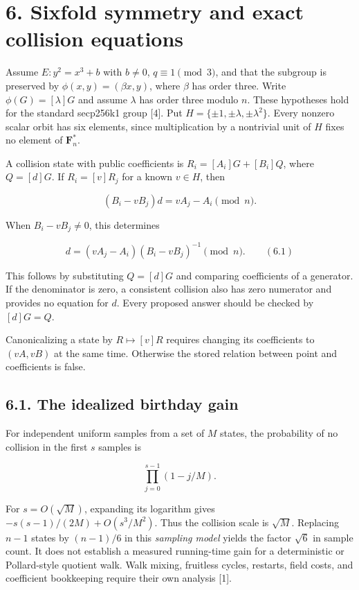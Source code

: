 \documentclass[
  11pt,
  a4paper,
]{article}
\begin{document}
\section{6. Sixfold symmetry and exact collision
equations}\label{sixfold-symmetry-and-exact-collision-equations}

Assume \(E:y^2=x^3+b\) with \(b\neq0\), \(q\equiv1\pmod3\), and that the
subgroup is preserved by \(\phi(x,y)=(\beta x,y)\), where \(\beta\) has
order three. Write \(\phi(G)=[\lambda]G\) and assume \(\lambda\) has
order three modulo \(n\). These hypotheses hold for the standard
secp256k1 group {[}4{]}. Put \(H=\{\pm1,\pm\lambda,\pm\lambda^2\}\).
Every nonzero scalar orbit has six elements, since multiplication by a
nontrivial unit of \(H\) fixes no element of \(\mathbf F_n^*\).

A collision state with public coefficients is \(R_i=[A_i]G+[B_i]Q\),
where \(Q=[d]G\). If \(R_i=[v]R_j\) for a known \(v\in H\), then

\[
(B_i-vB_j)d=vA_j-A_i\pmod n.
\]

When \(B_i-vB_j\neq0\), this determines

\[
d=(vA_j-A_i)(B_i-vB_j)^{-1}\pmod n. \qquad (6.1)
\]

This follows by substituting \(Q=[d]G\) and comparing coefficients of a
generator. If the denominator is zero, a consistent collision also has
zero numerator and provides no equation for \(d\). Every proposed answer
should be checked by \([d]G=Q\).

Canonicalizing a state by \(R\mapsto[v]R\) requires changing its
coefficients to \((vA,vB)\) at the same time. Otherwise the stored
relation between point and coefficients is false.

\subsection{6.1. The idealized birthday
gain}\label{the-idealized-birthday-gain}

For independent uniform samples from a set of \(M\) states, the
probability of no collision in the first \(s\) samples is

\[
\prod_{j=0}^{s-1}(1-j/M).
\]

For \(s=O(\sqrt M)\), expanding its logarithm gives
\(-s(s-1)/(2M)+O(s^3/M^2)\). Thus the collision scale is \(\sqrt M\).
Replacing \(n-1\) states by \((n-1)/6\) in this \emph{sampling model}
yields the factor \(\sqrt6\) in sample count. It does not establish a
measured running-time gain for a deterministic or Pollard-style quotient
walk. Walk mixing, fruitless cycles, restarts, field costs, and
coefficient bookkeeping require their own analysis {[}1{]}.
\end{document}
